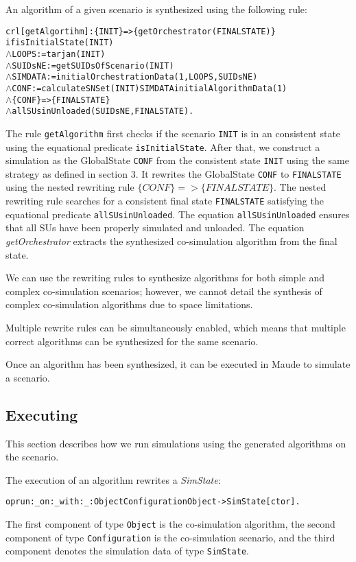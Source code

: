 An algorithm of a given scenario is synthesized using the following rule:
\small
\begin{alltt}
crl [getAlgortihm]: \{ INIT \} => \{ getOrchestrator(FINALSTATE) \}
if isInitialState(INIT)
  \(\land\) LOOPS := tarjan(INIT)
  \(\land\) SUIDsNE := getSUIDsOfScenario(INIT)
  \(\land\) SIMDATA := initialOrchestrationData(1,LOOPS,SUIDsNE)
  \(\land\) CONF := calculateSNSet(INIT) SIMDATA initialAlgorithmData(1)
  \(\land\) \{CONF\} => \{ FINALSTATE\} 
  \(\land\) allSUsinUnloaded(SUIDsNE, FINALSTATE) .
\end{alltt}
\normalfont
The rule \texttt{getAlgorithm} first checks if the scenario \texttt{INIT} is in an consistent state using the equational predicate \texttt{isInitialState}.
After that, we construct a simulation as the GlobalState \texttt{CONF} from the consistent state \texttt{INIT} using the same strategy as defined in section 3.
It rewrites the GlobalState \texttt{CONF} to \texttt{FINALSTATE} using the nested rewriting rule $\{CONF\} => \{ FINALSTATE\}$.
The nested rewriting rule searches for a consistent final state \texttt{FINALSTATE} satisfying the equational predicate \texttt{allSUsinUnloaded}.
The equation \texttt{allSUsinUnloaded} ensures that all SUs have been properly simulated and unloaded.
The equation \emph{getOrchestrator} extracts the synthesized co-simulation algorithm from the final state.

We can use the rewriting rules to synthesize algorithms for both simple and complex co-simulation scenarios; however, we cannot detail the synthesis of complex co-simulation algorithms due to space limitations.

Multiple rewrite rules can be simultaneously enabled, which means that multiple correct algorithms can be synthesized for the same scenario.

Once an algorithm has been synthesized, it can be executed in Maude to simulate a scenario.

\subsection{Executing}
This section describes how we run simulations using the generated algorithms on the scenario.

The execution of an algorithm rewrites a \emph{SimState}:
\small
\begin{alltt}
op run:_on:_with:_ : Object Configuration Object -> SimState [ctor]. 
\end{alltt}
\normalsize
The first component of type \texttt{Object} is the co-simulation algorithm, the second component of type \texttt{Configuration} is the co-simulation scenario, and the third component denotes the simulation data of type \texttt{SimState}.

